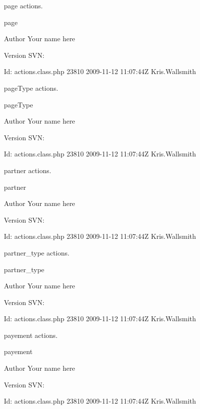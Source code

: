 page actions.

page \begin{DoxyAuthor}{Author}
Your name here 
\end{DoxyAuthor}
\begin{DoxyVersion}{Version}
S\-V\-N\-: 
\end{DoxyVersion}
\begin{DoxyParagraph}{Id\-:}
actions.\-class.\-php 23810 2009-\/11-\/12 11\-:07\-:44\-Z Kris.\-Wallsmith 
\end{DoxyParagraph}


page\-Type actions.

page\-Type \begin{DoxyAuthor}{Author}
Your name here 
\end{DoxyAuthor}
\begin{DoxyVersion}{Version}
S\-V\-N\-: 
\end{DoxyVersion}
\begin{DoxyParagraph}{Id\-:}
actions.\-class.\-php 23810 2009-\/11-\/12 11\-:07\-:44\-Z Kris.\-Wallsmith 
\end{DoxyParagraph}


partner actions.

partner \begin{DoxyAuthor}{Author}
Your name here 
\end{DoxyAuthor}
\begin{DoxyVersion}{Version}
S\-V\-N\-: 
\end{DoxyVersion}
\begin{DoxyParagraph}{Id\-:}
actions.\-class.\-php 23810 2009-\/11-\/12 11\-:07\-:44\-Z Kris.\-Wallsmith 
\end{DoxyParagraph}


partner\-\_\-type actions.

partner\-\_\-type \begin{DoxyAuthor}{Author}
Your name here 
\end{DoxyAuthor}
\begin{DoxyVersion}{Version}
S\-V\-N\-: 
\end{DoxyVersion}
\begin{DoxyParagraph}{Id\-:}
actions.\-class.\-php 23810 2009-\/11-\/12 11\-:07\-:44\-Z Kris.\-Wallsmith 
\end{DoxyParagraph}


payement actions.

payement \begin{DoxyAuthor}{Author}
Your name here 
\end{DoxyAuthor}
\begin{DoxyVersion}{Version}
S\-V\-N\-: 
\end{DoxyVersion}
\begin{DoxyParagraph}{Id\-:}
actions.\-class.\-php 23810 2009-\/11-\/12 11\-:07\-:44\-Z Kris.\-Wallsmith 
\end{DoxyParagraph}


